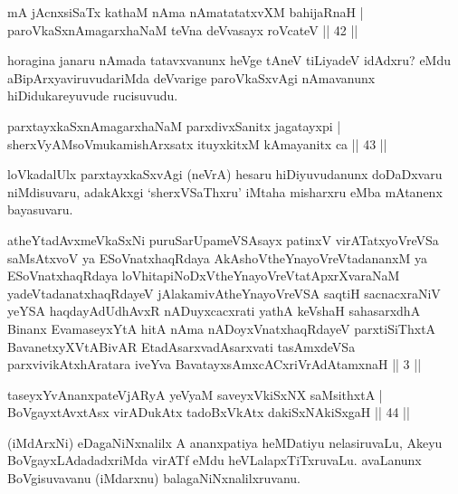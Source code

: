 
\begin{shl}
mA jAcnxsiSaTx kathaM nAma nAmatatatxvXM bahijaRnaH |\\
paroVkaSxnAmagarxhaNaM teVna deVvasayx roVcateV \hfill || 42 || 
\end{shl}

\begin{artha}
horagina janaru nAmada tatavxvanunx heVge tAneV tiLiyadeV idAdxru? eMdu aBipArxyaviruvudariMda deVvarige paroVkaSxvAgi nAmavanunx hiDidukareyuvude rucisuvudu.
\end{artha}


\begin{shl}
parxtayxkaSxnAmagarxhaNaM parxdivxSanitx jagatayxpi |\\
sherxVyAMsoV\s mukamishArxsatx ituyxkitxM kAmayanitx ca \hfill || 43 || 
\end{shl}

\begin{artha}
loVkadalUlx parxtayxkaSxvAgi (neVrA) hesaru hiDiyuvudanunx doDaDxvaru niMdisu\-varu, adakAkxgi `sherxVSaThxru' iMtaha misharxru eMba mAtanenx bayasuvaru.
\end{artha}
\begin{kandikeshl}
atheYtadAvxmeV\s kaSxNi puruSarUpameVSAsayx patinxV virATatxyoVreVSa saMsAtxvoV ya ESoV\s natxhaqRdaya AkAshoV\s theYnayoVreVtadananxM ya ESoV\s natxhaqRdaya loVhitapiNoDxV\s theYnayoVreVtatApxrXvaraNaM yadeVtadanatxhaqRdayeV jAlakamivAtheYnayoVreVSA saqtiH sacnacxraNiV yeYSA haqdayAdUdhAvxR nADuyxcacxrati yathA keVshaH sahasarxdhA Binanx EvamaseyxYtA hitA nAma nADoyxV\s natxhaqRdayeV parxtiSiThxtA BavanetxyXVtABivAR EtadAsarxvadAsarxvati tasAmxdeVSa parxvivikAtxhAratara iveYva BavatayxsAmxcACxriVrAdAtamxnaH || 3 ||
\end{kandikeshl}


\begin{shl}
taseyxYvAnanxpateVjARyA yeVyaM saveyxV\s kiSxNX saMsithxtA |\\
BoVgayxtAvxtAsx virADukAtx tadoBxVkAtx dakiSxNAkiSxgaH \hfill || 44 || 
\end{shl}

\begin{artha}
(iMdArxNi) eDagaNiNxnalilx A ananxpatiya heMDatiyu nelasiruvaLu, Akeyu BoVgayxLAdadadxriMda virATf eMdu heVLalapxTiTxruvaLu. avaLanunx BoVgisuvavanu (iMdarxnu) balagaNiNxnalilxruvanu.
\end{artha}

